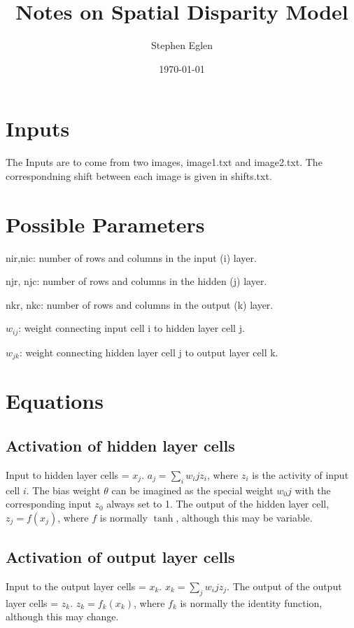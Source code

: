 \documentclass[a4paper]{article}
\begin{document}
\title{Notes on Spatial Disparity Model}
\author{Stephen Eglen}
\date{\today}
\maketitle
\section{Inputs}

The Inputs are to come from two images, image1.txt and image2.txt.
The correspondning shift between each image is given in shifts.txt.


\section{Possible Parameters}





nir,nic: number of rows and columns in the input (i) layer.

njr, njc: number of rows and columns in the hidden (j) layer.

nkr, nkc: number of rows and columns in the output (k) layer.

$w_{ij}$: weight connecting input cell i to hidden layer cell j.

$w_{jk}$: weight connecting hidden layer cell j to output layer cell
k.

\section{Equations}


\subsection{Activation of hidden layer cells}


Input to hidden layer cells = $x_j$.  $a_j = \sum_i w_ij z_i$, where
$z_i$ is the activity of input cell $i$.  The bias weight $\theta$ can
be imagined as the special weight $w_0j$ with the corresponding input
$z_0$ always set to 1.  The output of the hidden layer cell, $z_j = f
(x_j)$, where $f$ is normally $\tanh$, although this may be variable.

\subsection{Activation of output layer cells}

Input to the output layer cells = $x_k$.  $x_k = \sum_j w_ij z_j$.
The output of the output layer cells = $z_k$. $z_k = f_k(x_k)$, where
$f_k$ is normally the identity function, although this may change.
\end{document}
